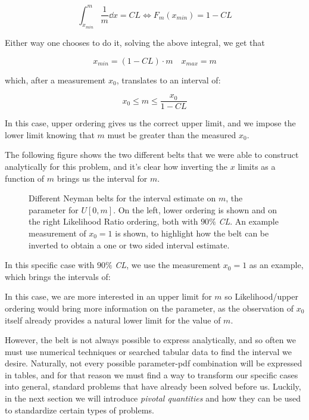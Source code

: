 \begin{example}
	\[
	\int_{x_{min}}^m \frac{1}{m}\dd x = CL \iff F_{m}(x_{min}) = 1 - CL
	\]
	
	Either way one chooses to do it, solving the above integral, we get that
	
	\[
	x_{min} = (1-CL)\cdot m \quad x_{max} = m
	\]
	
	which, after a measurement $x_0$, translates to an interval of:
	
	\[
	x_0\leq m \leq \frac{x_0}{1-CL}
	\]
	
	In this case, upper ordering gives us the correct upper limit, and we impose the lower limit knowing that $m$ must be greater than the measured $x_0$.
	
	The following figure shows the two different belts that we were able to construct analytically for this problem, and it's clear how inverting the $x$ limits as a function of $m$ brings us the interval for $m$.
	
		\begin{figure}[H]
		\centering
		
		\caption{Different Neyman belts for the interval estimate on $m$, the parameter for $U\left[0,m\right]$. On the left, lower ordering is shown and on the right Likelihood Ratio ordering, both with $90\%$ \emph{CL}. An example measurement of $x_0=1$ is shown, to highlight how the belt can be inverted to obtain a one or two sided interval estimate.}
		\label{fig:uniform_belts}
	\end{figure}
	
	In this specific case with $90\%$ \emph{CL}, we use the measurement $x_0=1$ as an example, which brings the intervals of:
		
		
		
	In this case, we are more interested in an upper limit for $m$ so Likelihood/upper ordering would bring more information on the parameter, as the observation of $x_0$ itself already provides a natural lower limit for the value of $m$. 
\end{example}

However, the belt is not always possible to express analytically, and so often we must use numerical techniques or searched tabular data to find the interval we desire. Naturally, not every possible parameter-pdf combination will be expressed in tables, and for that reason we must find a way to transform our specific cases into general, standard problems that have already been solved before us. Luckily, in the next section we will introduce \emph{pivotal quantities} and how they can be used to standardize certain types of problems.

